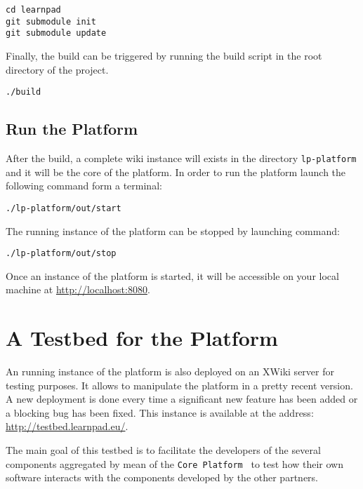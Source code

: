 \documentclass{learnpad}
\begin{document}
\begin{lstlisting}[style=javaCode, breaklines]
cd learnpad
git submodule init
git submodule update
\end{lstlisting}

Finally, the build can be triggered by running the build script in the 
root directory of the project.

\begin{lstlisting}[style=javaCode, breaklines]
./build
\end{lstlisting}

\section{Run the Platform}
\label{sec:run}

After the build, a complete wiki instance will exists in the directory 
\texttt{lp-platform} and it will be the core of the platform. In order to run
the platform launch the following command form a terminal:

\begin{lstlisting}[style=javaCode, breaklines]
./lp-platform/out/start
\end{lstlisting}

The running instance of the platform can be stopped by launching command:

\begin{lstlisting}[style=javaCode, breaklines]
./lp-platform/out/stop
\end{lstlisting}

Once an instance of the \learnpad platform is started, it will be accessible on 
your local machine at \url{http://localhost:8080}.


\chapter{A Testbed for the \learnpad Platform}
\label{ch:testbed}

An running instance of the \learnpad platform is also deployed on an XWiki 
server for testing purposes.  It allows to manipulate the platform in a pretty 
recent version.  A new deployment is done every time a significant new feature 
has been added or a blocking bug has been fixed. This instance is available 
at the address: \url{http://testbed.learnpad.eu/}.

The main goal of this testbed is to facilitate the developers of the several 
components aggregated by mean of the \texttt{\learnpad Core 
Platform}~\cite{learnpad:D2.1} to test how their own software interacts with 
the components developed by the other partners.
\end{document}
